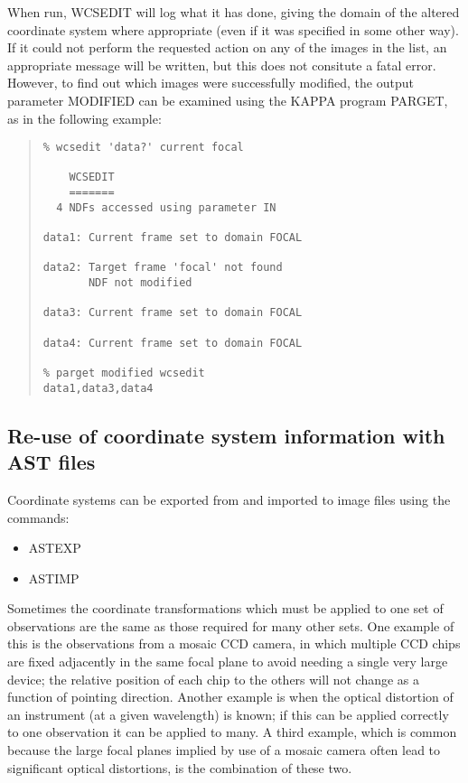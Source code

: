 \documentclass[twoside,11pt]{article}
\newcommand{\xref}[3]{#1}
\newcommand{\xlabel}[1]{}
\renewcommand{\_}{\texttt{\symbol{95}}}
\newenvironment{myquote}{\begin{quote}\begin{small}}{\end{small}\end{quote}}
\newcommand{\routine}[1]{{\sc #1}}
\begin{document}
When run, \routine{WCSEDIT} will log what it has done, 
giving the domain of the altered coordinate system where appropriate
(even if it was specified in some other way).
If it could not perform the requested action on any of the images
in the list, an appropriate message will be written, but this
does not consitute a fatal error.
However, to find out which images were successfully modified, the
output parameter MODIFIED can be examined using the
KAPPA program \xref{PARGET}{sun95}{PARGET}, as in
the following example:
\begin{myquote}
\begin{verbatim}
% wcsedit 'data?' current focal

    WCSEDIT
    =======
  4 NDFs accessed using parameter IN

data1: Current frame set to domain FOCAL

data2: Target frame 'focal' not found
       NDF not modified

data3: Current frame set to domain FOCAL

data4: Current frame set to domain FOCAL

% parget modified wcsedit
data1,data3,data4
\end{verbatim}
\end{myquote}



\subsection{\xlabel{astfiles}\label{astfiles}Re-use of coordinate system
            information with AST files}

Coordinate systems can be exported from and imported to
image files using the commands:
\begin{itemize}
\item \routine{ASTEXP}
\item \routine{ASTIMP}
\end{itemize}

Sometimes the coordinate transformations which must be applied
to one set of observations are the same as those
required for many other sets.
One example of this is the observations from a mosaic
CCD camera, in which multiple CCD chips are fixed adjacently 
in the same focal plane to avoid needing a single very large device;
the relative position of each chip to the others 
will not change as a function of pointing direction.
Another example is when the optical distortion of an instrument
(at a given wavelength) is known; if this can be applied
correctly to one observation it can be applied to many.
A third example, which is common because the large focal planes
implied by use of a mosaic camera often lead to significant
optical distortions, is the combination of these two.
\end{document}
